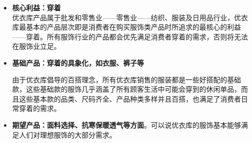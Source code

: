 \documentclass{xjtureport}
\begin{document}
\begin{itemize}
    \item \textbf{核心利益：穿着}\\优衣库产品属于批发和零售业——零售业——纺织、服装及日用品行业，优衣库最基本的产品层次即是消费者在购买服饰类产品时所追求的最核心的利益——穿着。所有服饰行业的产品都会优先满足消费者穿着的需求，否则将无法在服饰业立足。
    \item \textbf{基础产品：穿着的具象化，如衣服、裤子等}
    
    由于优衣库倡导的百搭理念，所有优衣库销售的服装都是一些好搭配的基础款，这些基础款的服饰几乎涵盖了所有顾客生活中可能会穿到的休闲单品，而且这些基本款的品类、尺码齐全、产品种类多样并且百搭，也满足了消费者日常穿着的需求。
    \item \textbf{期望产品：面料选择、抗寒保暖透气等方面}。可以说优衣库的服饰基本能够满足人们对理想服饰的大部分需求。
    \begin{enumerate}

\end{enumerate}
\end{itemize}
\end{document}
